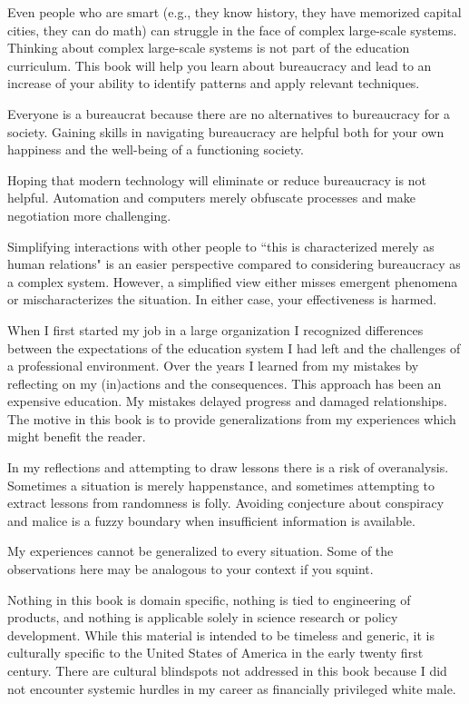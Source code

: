 Even people who are smart (e.g., they know history, they have memorized capital cities, they can do math) can struggle in the face of complex large-scale systems. Thinking about complex large-scale systems is not part of the education curriculum. This book will help you learn about bureaucracy and lead to an increase of your ability to identify patterns and apply relevant techniques.

Everyone is a bureaucrat because there are no alternatives to bureaucracy for a society. Gaining skills in navigating bureaucracy are helpful both for your own happiness and the well-being of a functioning society. 

Hoping that modern technology will eliminate or reduce bureaucracy is not helpful. Automation and computers merely obfuscate processes and make negotiation more challenging. 

Simplifying interactions with other people to ``this is characterized merely as human relations" is an easier perspective compared to considering bureaucracy as a complex system. 
However, a simplified view either misses emergent phenomena or mischaracterizes the situation. In either case, your effectiveness is harmed.



 When I first started my job in a large organization I recognized differences between the expectations of the education system I had left and the challenges of a professional environment. Over the years I learned from my mistakes by reflecting on my (in)actions and the consequences. This approach has been an expensive education. My mistakes delayed progress and damaged relationships. The motive in this book is to provide generalizations from my experiences which might benefit the reader.



In my reflections and attempting to draw lessons there is a risk of overanalysis. Sometimes a situation is merely happenstance, and sometimes attempting to extract lessons from randomness is folly. Avoiding conjecture about conspiracy and malice is a fuzzy boundary when insufficient information is available. 

My experiences cannot be generalized to every situation. Some of the observations here may be analogous to your context if you squint. 

Nothing in this book is domain specific, nothing is tied to engineering of products, and nothing is applicable solely in science research or policy development. While this material is intended to be timeless and generic, it is culturally specific to the United States of America in the early twenty first century. There are cultural blindspots not addressed in this book because I did not encounter systemic hurdles in my career as financially privileged white male. 

